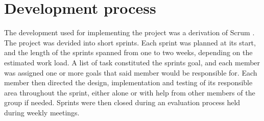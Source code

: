 \section{Development process}

The development used for implementing the project was a derivation of Scrum \cite{Scrum}. The project
was devided into short sprints. Each sprint was planned at its start, and the length of
the sprints spanned from one to two weeks, depending on the estimated work load. A list
of task constituted the sprints goal, and each member was assigned one or more goals
that said member would be responsible for. Each member then directed the design,
implementation and testing of its responsible area throughout the sprint, either alone or
with help from other members of the group if needed. Sprints were then closed during an
evaluation process held during weekly meetings.
